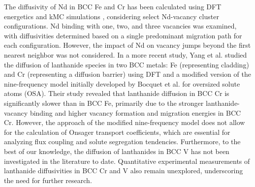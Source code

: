 \documentclass[preprint,12pt]{elsarticle}
\begin{document}

The diffusivity of Nd in BCC Fe and Cr has been calculated using DFT energetics and kMC simulations \cite{aagesen_jr_physics-based_2022, aagesen_mechanistic_2023}, considering select Nd-vacancy cluster configurations. Nd binding with one, two, and three vacancies was examined, with diffusivities determined based on a single predominant migration path for each configuration. However, the impact of Nd on vacancy jumps beyond the first nearest neighbor was not considered. In a more recent study, Yang et al. \cite{yang_significant_2023} studied the diffusion of lanthanide species in two BCC metals: Fe (representing cladding) and Cr (representing a diffusion barrier) using DFT and a modified version of the nine-frequency model initially developed by Bocquet et al. \cite{bocquet_migration_2017} for oversized solute atoms (OSA). Their study revealed that lanthanide diffusion in BCC Cr is significantly slower than in BCC Fe, primarily due to the stronger lanthanide-vacancy binding and higher vacancy formation and migration energies in BCC Cr. 
However, the approach of the modified nine-frequency model does not allow for the calculation of Onsager transport coefficients, which are essential for analyzing flux coupling and solute segregation tendencies. Furthermore, to the best of our knowledge, the diffusion of lanthanides in BCC V has not been investigated in the literature to date. Quantitative experimental measurements of lanthanide diffusivities in BCC Cr and V also remain unexplored, underscoring the need for further research.
\end{document}
